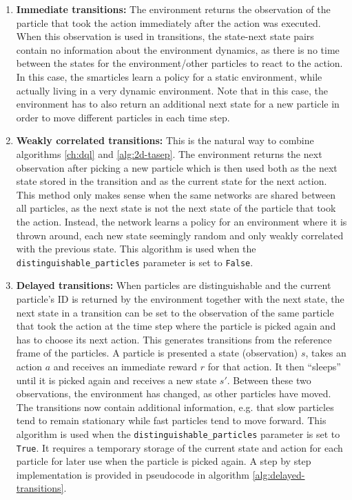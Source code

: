 \begin{enumerate}
    \item \textbf{Immediate transitions:} The environment returns the observation of the particle that took the action immediately after the action was executed. When this observation is used in transitions, the state-next state pairs contain no information about the environment dynamics, as there is no time between the states for the environment/other particles to react to the action. In this case, the smarticles learn a policy for a static environment, while actually living in a very dynamic environment. Note that in this case, the environment has to also return an additional next state for a new particle in order to move different particles in each time step.
    \item \textbf{Weakly correlated transitions:} This is the natural way to combine algorithms \ref{ch:dql} and \ref{alg:2d-tasep}. The environment returns the next observation after picking a new particle which is then used both as the next state stored in the transition and as the current state for the next action. This method only makes sense when the same networks are shared between all particles, as the next state is not the next state of the particle that took the action. Instead, the network learns a policy for an environment where it is thrown around, each new state seemingly random and only weakly correlated with the previous state. This algorithm is used when the \texttt{distinguishable\_particles} parameter is set to \texttt{False}.
    \item \textbf{Delayed transitions:} When particles are distinguishable and the current particle's ID is returned by the environment together with the next state, the next state in a transition can be set to the observation of the same particle that took the action at the time step where the particle is picked again and has to choose its next action. This generates transitions from the reference frame of the particles. A particle is presented a state (observation) $s$, takes an action $a$ and receives an immediate reward $r$ for that action. It then \enquote{sleeps} until it is picked again and receives a new state $s'$. Between these two observations, the environment has changed, as other particles have moved. The transitions now contain additional information, e.g. that slow particles tend to remain stationary while fast particles tend to move forward. This algorithm is used when the \texttt{distinguishable\_particles} parameter is set to \texttt{True}. It requires a temporary storage of the current state and action for each particle for later use when the particle is picked again. A step by step implementation is provided in pseudocode in algorithm \ref{alg:delayed-transitions}.
\end{enumerate}

